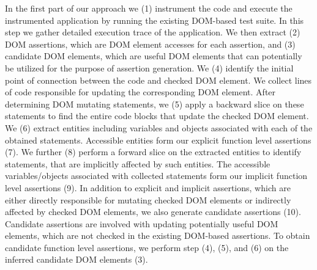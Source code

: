 In the first part of our approach we (1) instrument the \javascript code and execute the instrumented application by running the existing DOM-based test suite. In this step we gather detailed execution trace of the application. We then extract (2) DOM assertions, which are DOM element accesses for each assertion, and (3) candidate DOM elements, which are useful DOM elements that can potentially be utilized for the purpose of assertion generation. We (4) identify the initial point of connection between the \javascript code and checked DOM element. We collect lines of code responsible for updating the corresponding DOM element. After determining DOM mutating statements, we (5) apply a backward slice on these statements to find the entire code blocks that update the checked DOM element. We (6) extract \javascript entities including variables and objects associated with each of the obtained statements. Accessible entities form our explicit function level assertions (7). We further (8) perform a forward slice on the extracted \javascript entities to identify statements, that are implicitly affected by such entities. The accessible \javascript variables/objects associated with collected statements form our implicit function level assertions (9). In addition to explicit and implicit assertions, which are either directly responsible for mutating checked DOM elements or indirectly affected by checked DOM elements, we also generate candidate assertions (10). Candidate assertions are involved with updating potentially useful DOM elements, which are not checked in the existing DOM-based assertions. To obtain candidate function level assertions, we perform step (4), (5), and (6) on the inferred candidate DOM elements (3).         

